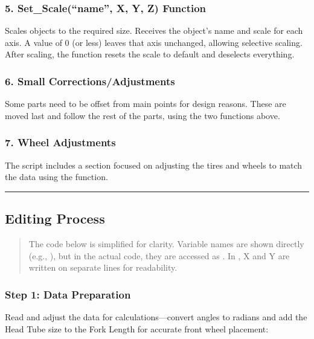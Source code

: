 \documentclass[letterpaper,10pt,english]{jupyterBook}
\begin{document}
\subsubsection{5. Set\_Scale(“name”, X, Y, Z) Function}
\label{\detokenize{Edit Script:set-scale-name-x-y-z-function}}
\sphinxAtStartPar
Scales objects to the required size. Receives the object’s name and scale for each axis. A value of 0 (or less) leaves that axis unchanged, allowing selective scaling. After scaling, the function resets the scale to default and deselects everything.


\subsubsection{6. Small Corrections/Adjustments}
\label{\detokenize{Edit Script:small-corrections-adjustments}}
\sphinxAtStartPar
Some parts need to be offset from main points for design reasons. These are moved last and follow the rest of the parts, using the two functions above.


\subsubsection{7. Wheel Adjustments}
\label{\detokenize{Edit Script:wheel-adjustments}}
\sphinxAtStartPar
The script includes a section focused on adjusting the tires and wheels to match the data using the  function.


\bigskip\hrule\bigskip



\subsection{Editing Process}
\label{\detokenize{Edit Script:editing-process}}\begin{quote}

\sphinxAtStartPar
{} The code below is simplified for clarity. Variable names are shown directly (e.g., ), but in the actual code, they are accessed as . In , X and Y are written on separate lines for readability.
\end{quote}


\subsubsection{Step 1: Data Preparation}
\label{\detokenize{Edit Script:step-1-data-preparation}}
\sphinxAtStartPar
Read and adjust the data for calculations—convert angles to radians and add the Head Tube size to the Fork Length for accurate front wheel placement:
\end{document}
